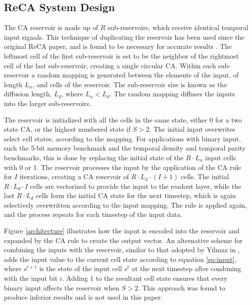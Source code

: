 \documentclass{elsarticle}
\begin{document}
\begin{multicols}{2}
\subsection{ReCA System Design}
The CA reservoir is made up of $R$ sub-reservoirs, which receive identical 
temporal input signals. This technique of duplicating the reservoir has been 
used since the original ReCA paper, and is found to be necessary for accurate 
results \cite{yilmaz2014reservoir}.
The leftmost cell of the first sub-reservoir is set to be the 
neighbor of the rightmost cell of the last sub-reservoir, creating a single 
circular CA.  Within each sub-reservoir a random mapping is generated between 
the elements of the input, of length $L_{n}$, and cells of the reservoir. The 
sub-reservoir size is known as the diffusion length, $L_{d}$, where $L_{n} < 
L_{d}$. The random mapping diffuses the inputs into the larger sub-reservoirs.  
\par The reservoir is initialized with all the cells in the same state, either 
0 for a two state CA, or the highest numbered state if $S > 2$. The initial 
input overwrites select cell states, according to the mapping. For applications 
with binary input, such the 5-bit memory benchmark and the temporal density and 
temporal parity benchmarks, this is done by replacing the initial state of the 
$R \cdot L_{n}$ input cells with 0 or 1.  The reservoir processes the input by 
the application of the CA rule for $I$ iterations, creating a CA reservoir of $R 
\cdot L_{d} \cdot (I + 1)$ cells.  The initial $R \cdot L_{d} \cdot I$ cells 
are vectorized to provide the input to the readout layer, while the last $R 
\cdot L_{d}$ cells form the initial CA state for the next timestep, which is 
again selectively overwritten according to the input mapping. The rule is 
applied again, and the process repeats for each timestep of the input data.  
\par  


Figure \ref{architecture} illustrates how the input is encoded into the 
reservoir and expanded by the CA rule to create the output vector.  An 
alternative scheme for combining the inputs with the reservoir, similar to that 
adopted by Yilmaz in \cite{yilmaz2015connectionist}, adds the input value to 
the current cell state according to equation \ref{eq:input}, where $s^{t+1}$ is 
the state of the input cell $s^t$ at the next timestep after combining with the 
input bit $i$.  Adding 1 to the resultant cell state ensures that every binary 
input affects the reservoir when $S > 2$.  This approach was found to produce 
inferior results and is not used in this paper.


\end{multicols}
\end{document}
